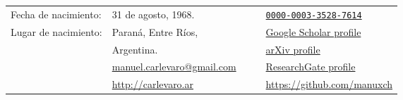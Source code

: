 %
%
\begin{center}
	\begin{tabular}{l l p{1cm} c l}
    Fecha de nacimiento:                                  & 31 de agosto, 1968.                                                  &  &          & \href{https://orcid.org/0000-0003-3528-7614}{\texttt{0000-0003-3528-7614}}                                          \\

    Lugar de nacimiento:                                  & Paraná, Entre Ríos,                                                  &  &  & \href{https://scholar.google.com.ar/citations?user=FoBqqJgAAAAJ                    & hl=en}{Google Scholar profile} \\
                                                          & Argentina.                                                           &  &          & \href{https://arxiv.org/a/carlevaro_m_1.html}{arXiv profile}                                                        \\
		      & \href{mailto:manuel.carlevaro@gmail.com}{manuel.carlevaro@gmail.com} &  & \color{DimGrey}{\aiResearchGate}  & \href{https://www.researchgate.net/profile/Manuel-Carlevaro}{ResearchGate profile}                                  \\
		 & \href{http://carlevaro.ar}{http://carlevaro.ar}                      &  & \color{DimGrey}{\faGithub}        & \href{https://github.com/manuxch}{https://github.com/manuxch}
	\end{tabular}
\end{center}

